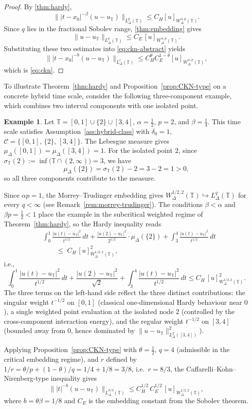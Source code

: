 \documentclass[11pt,a4paper]{article}
\numberwithin{equation}{section}
\theoremstyle{definition}
\newtheorem{example}[example]{Example}
\newcommand{\T}{\mathbb{T}}
\begin{document}
\begin{proof}
By \cref{thm:hardy},
\[
\bigl\||t-x_0|^{-\beta}(u-u_\T)\bigr\|_{L^p_\Delta(\T)}
\le C_H [u]_{W^{\alpha,p}_\Delta(\T)}.
\]
Since $q$ lies in the fractional Sobolev range, \cref{thm:embedding} gives
\[
\|u-u_{\T}\|_{L^q_\Delta(\T)}
\le C_E\,[u]_{W^{\alpha,p}_\Delta(\T)}.
\]
Substituting these two estimates into \eqref{eq:ckn-abstract} yields
\[
\bigl\||t-x_0|^{-b}(u-u_\T)\bigr\|_{L^r_\Delta(\T)}
\le C_H^\theta C_E^{1-\theta}[u]_{W^{\alpha,p}_\Delta(\T)},
\]
which is \eqref{eq:ckn}.
\end{proof}

To illustrate Theorem~\ref{thm:hardy} and
Proposition~\ref{prop:CKN-type} on a concrete hybrid time scale,
consider the following three-component example, which combines
two interval components with one isolated point.

\begin{example}\label{ex:hardy-ckn}
Let $\T=[0,1]\cup\{2\}\cup[3,4]$, $\alpha=\frac{1}{2}$, $p=2$,
and $\beta=\frac{1}{4}$.
This time scale satisfies Assumption~\ref{ass:hybrid-class} with
$\delta_0=1$, $\mathcal{C}=\{[0,1],\,\{2\},\,[3,4]\}$.
The Lebesgue measure gives $\mu_\Delta([0,1])=\mu_\Delta([3,4])=1$.
For the isolated point $2$, since
$\sigma_\T(2):=\inf\bigl(\T\cap(2,\infty)\bigr)=3$,
we have
\[
\mu_\Delta(\{2\})=\sigma_\T(2)-2=3-2=1>0,
\]
so all three components contribute to the measure.

Since $\alpha p=1$, the Morrey--Trudinger embedding gives
$W^{1/2,2}_\Delta(\T)\hookrightarrow L^q_\Delta(\T)$
for every $q<\infty$ (see Remark~\ref{rem:morrey-trudinger}).
The conditions $\beta<\alpha$ and $\beta p=\frac{1}{2}<1$ place the example in the subcritical weighted regime of Theorem~\ref{thm:hardy}, so the Hardy inequality reads
\begin{align*}
&\int_0^1\frac{|u(t)-u_\T|^2}{t^{1/2}}\,dt
+\frac{|u(2)-u_\T|^2}{2^{1/2}}\cdot\mu_\Delta(\{2\})
+\int_3^4\frac{|u(t)-u_\T|^2}{t^{1/2}}\,dt\\
&\qquad\le\; C_H\,[u]^2_{W^{1/2,2}_\Delta(\T)},
\end{align*}
i.e.,
\[
\int_0^1\frac{|u(t)-u_\T|^2}{t^{1/2}}\,dt
+\frac{|u(2)-u_\T|^2}{\sqrt{2}}
+\int_3^4\frac{|u(t)-u_\T|^2}{t^{1/2}}\,dt
\le C_H\,[u]^2_{W^{1/2,2}_\Delta(\T)}.
\]
The three terms on the left-hand side reflect the three distinct
contributions: the singular weight $t^{-1/2}$ on $[0,1]$
(classical one-dimensional Hardy behaviour near $0$),
a single weighted point evaluation at the isolated node $2$
(controlled by the cross-component interaction energy),
and the regular weight $t^{-1/2}$ on $[3,4]$
(bounded away from $0$, hence dominated by
$\|u-u_\T\|^2_{L^2_\Delta([3,4])}$).

Applying Proposition~\ref{prop:CKN-type} with $\theta=\frac{1}{2}$,
$q=4$ (admissible in the critical embedding regime), and $r$ defined by
$1/r=\theta/p+(1-\theta)/q=1/4+1/8=3/8$, i.e.\ $r=8/3$,
the Caffarelli--Kohn--Nirenberg-type inequality gives
\[
\bigl\||t|^{-b}(u-u_\T)\bigr\|_{L^{8/3}_\Delta(\T)}
\le C_H^{1/2}\,C_E^{1/2}\,[u]_{W^{1/2,2}_\Delta(\T)},
\]
where $b=\theta\beta=1/8$ and $C_E$ is the embedding constant
from the Sobolev theorem.
\end{example}
\end{document}
